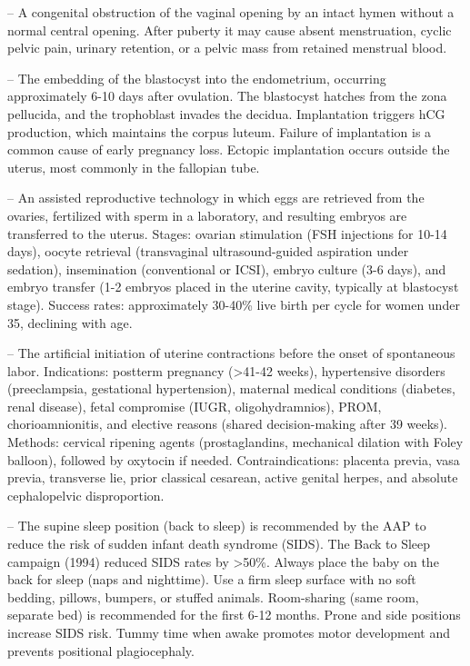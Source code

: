-- A congenital obstruction of the vaginal opening by an intact hymen without a normal central opening. After puberty it may cause absent menstruation, cyclic pelvic pain, urinary retention, or a pelvic mass from retained menstrual blood.

-- The embedding of the blastocyst into the endometrium, occurring approximately 6-10 days after ovulation. The blastocyst hatches from the zona pellucida, and the trophoblast invades the decidua. Implantation triggers hCG production, which maintains the corpus luteum. Failure of implantation is a common cause of early pregnancy loss. Ectopic implantation occurs outside the uterus, most commonly in the fallopian tube.

-- An assisted reproductive technology in which eggs are retrieved from the ovaries, fertilized with sperm in a laboratory, and resulting embryos are transferred to the uterus. Stages: ovarian stimulation (FSH injections for 10-14 days), oocyte retrieval (transvaginal ultrasound-guided aspiration under sedation), insemination (conventional or ICSI), embryo culture (3-6 days), and embryo transfer (1-2 embryos placed in the uterine cavity, typically at blastocyst stage). Success rates: approximately 30-40\% live birth per cycle for women under 35, declining with age.

-- The artificial initiation of uterine contractions before the onset of spontaneous labor. Indications: postterm pregnancy (>41-42 weeks), hypertensive disorders (preeclampsia, gestational hypertension), maternal medical conditions (diabetes, renal disease), fetal compromise (IUGR, oligohydramnios), PROM, chorioamnionitis, and elective reasons (shared decision-making after 39 weeks). Methods: cervical ripening agents (prostaglandins, mechanical dilation with Foley balloon), followed by oxytocin if needed. Contraindications: placenta previa, vasa previa, transverse lie, prior classical cesarean, active genital herpes, and absolute cephalopelvic disproportion.

-- The supine sleep position (back to sleep) is recommended by the AAP to reduce the risk of sudden infant death syndrome (SIDS). The Back to Sleep campaign (1994) reduced SIDS rates by >50\%. Always place the baby on the back for sleep (naps and nighttime). Use a firm sleep surface with no soft bedding, pillows, bumpers, or stuffed animals. Room-sharing (same room, separate bed) is recommended for the first 6-12 months. Prone and side positions increase SIDS risk. Tummy time when awake promotes motor development and prevents positional plagiocephaly.

